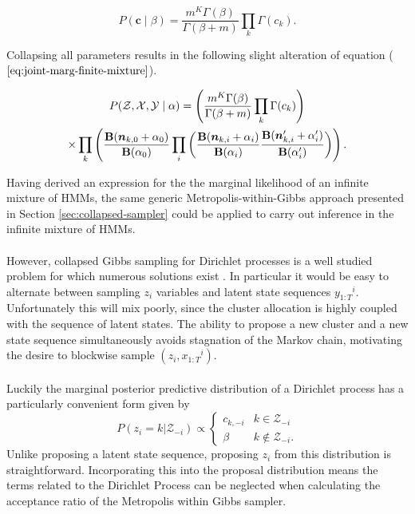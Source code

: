 \documentclass[12pt]{report}
\newcommand{\p}[0]{\prime}
\newcommand{\1}[0]{\mathbbm{1}}
\newcommand{\Bf}[0]{\text{\textbf{B}}}
\newcommand{\seq}[3]{\ensuremath{#1_{{#2}:{#3}}}}
\begin{document}
\begin{equation}\label{dp-marg}
    P(\bm{c} \mid \beta) = \frac{m^K \Gamma(\beta)}{\Gamma(\beta + m)} \prod_k \Gamma(c_k).
\end{equation}

Collapsing all parameters results in the following slight alteration of 
equation ($\ref{eq:joint-marg-finite-mixture}$).

\begin{multline}
    P(\mathcal{Z}, \mathcal{X}, \mathcal{Y} \mid \alpha) =
    \left(\frac{m^K \Gamma(\beta)}{\Gamma(\beta + m)} \prod_k \Gamma(c_k)\right) \\
    \times \prod_k 
    \left(
        \frac{\Bf(\bm{n}_{k,0} + \alpha_0)}{\Bf(\alpha_0)} 
        \prod_i 
        \left(
            \frac{\Bf(\bm{n}_{k,i} + \alpha_i)}{\Bf(\alpha_i)} 
            \frac{\Bf(\bm{n}_{k,i}^\p + \alpha_i^\p)}{\Bf(\alpha_i^\p)}
        \right)
    \right). \label{eq:joint-marg-infinite-mixture}
\end{multline}

Having derived an expression for the the marginal likelihood of an infinite
mixture of \acp{HMM}, the same generic Metropolis-within-Gibbs approach presented
in Section \ref{sec:collapsed-sampler} could be applied to carry out inference in
the infinite mixture of \acp{HMM}. 
\\\\
However, collapsed Gibbs sampling for Dirichlet processes is a well studied problem for 
which numerous solutions exist \cite{neal-mcmc-dp}. In particular it would be easy
to alternate between sampling $z_i$ variables and latent state sequences $\seq{y}{1}{T}^i$.
Unfortunately this will mix poorly, since the cluster allocation is highly coupled with
the sequence of latent states. The ability to propose a new cluster and a new state sequence 
simultaneously avoids stagnation of the Markov chain, motivating the desire to blockwise sample
$(z_i, \seq{x}{1}{T}^i)$.
\\\\
Luckily the marginal posterior predictive distribution of a Dirichlet process has a particularly 
convenient form \cite{infinite-gmm} given by
\[
    P(z_i=k|\mathcal{Z}_{-i}) \propto
    \begin{cases} 
        c_{k,-i} & k \in \mathcal{Z}_{-i} \\
        \beta   & k \not\in \mathcal{Z}_{-i}.
    \end{cases}
\]
Unlike proposing a latent state sequence, proposing $z_i$ from this distribution is straightforward.
Incorporating this into the proposal distribution means the terms related to the Dirichlet Process 
can be neglected when calculating the acceptance ratio of the Metropolis within Gibbs sampler.
\end{document}
